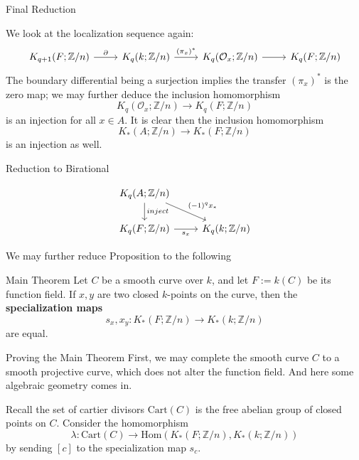 \documentclass{beamer}
\begin{document}
\begin{frame}[fragile]{Final Reduction}

We look at the localization sequence again:
\[\begin{tikzcd}
	{K_{q+1}(F; \mathbb{Z}/n)} & {K_{q}(k; \mathbb{Z}/n)} & {K_{q}(\mathcal{O}_x; \mathbb{Z}/n)} & {K_{q}(F; \mathbb{Z}/n)}
	\arrow["\partial", from=1-1, to=1-2]
	\arrow["{(\pi_x)^*}", from=1-2, to=1-3]
	\arrow[from=1-3, to=1-4]
\end{tikzcd}\]
The boundary differential being a surjection implies the transfer $(\pi_x)^*$ is the zero map; we may further deduce the inclusion homomorphism 
\[K_{q}(\mathcal{O}_x; \mathbb{Z}/n)\to K_{q}(F; \mathbb{Z}/n)\]
is an injection for all $x\in A$. It is clear then the inclusion homomorphism 
\[K_*(A; \mathbb{Z}/n)\to K_*(F; \mathbb{Z}/n)\]
is an injection as well.



\end{frame}










\begin{frame}[fragile]{Reduction to Birational}

\[\begin{tikzcd}
	{K_q(A; \mathbb{Z}/n)} \\
	{K_q(F; \mathbb{Z}/n)} & {K_q(k; \mathbb{Z}/n)}
	\arrow["inject", from=1-1, to=2-1]
	\arrow["{(-1)^qx_*}", from=1-1, to=2-2]
	\arrow["{s_x}"', from=2-1, to=2-2]
\end{tikzcd}\]

We may further reduce Proposition to the following 
\begin{block}{Main Theorem}
  Let $C$ be a smooth curve over $k$, and let $F:= k(C)$ be its function field. If $x,y$ are two closed $k$-points on the curve, then the \textbf{specialization maps}
  \[s_x,x_y: K_*(F; \mathbb{Z}/n)\to K_*(k; \mathbb{Z}/n)\]
  are equal.
\end{block}
\end{frame}


\begin{frame}{Proving the Main Theorem}
  First, we may complete the smooth curve $C$ to a smooth projective curve, which does not alter the function field. And here some algebraic geometry comes in.\vfill 


Recall the set of cartier divisors $\textrm{Cart}(C)$ is the free abelian group of closed points on $C$. Consider the homomorphism 
\[\lambda: \textrm{Cart}(C)\to \textrm{Hom}(K_*(F; \mathbb{Z}/n), K_*(k; \mathbb{Z}/n))\]
by sending $[c]$ to the specialization map $s_c$.

\end{frame}
\end{document}
